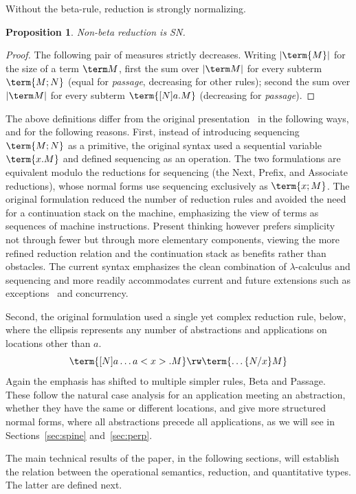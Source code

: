 \documentclass[10pt,a4paper]{amsart}
\newtheorem{proposition}[theorem]{Proposition}
\begin{document}
Without the beta-rule, reduction is strongly normalizing.

\begin{proposition}
\label{prop:non-beta SN}
Non-beta reduction is SN.
\end{proposition}

\begin{proof}
The following pair of measures strictly decreases. Writing $|\term{M}|$ for the size of a term $\term M$, first the sum over $|\term M|$ for every subterm $\term{M;N}$ (equal for \emph{passage}, decreasing for other rules); second the sum over $|\term M|$ for every subterm $\term{[N]a.M}$ (decreasing for \emph{passage}).
\end{proof}

The above definitions differ from the original presentation~\cite{Heijltjes-2022} in the following ways, and for the following reasons. First, instead of introducing sequencing $\term{M;N}$ as a primitive, the original syntax used a sequential variable $\term{x.M}$ and defined sequencing as an operation. The two formulations are equivalent modulo the reductions for sequencing (the Next, Prefix, and Associate reductions), whose normal forms use sequencing exclusively as $\term{x;M}$. The original formulation reduced the number of reduction rules and avoided the need for a continuation stack on the machine, emphasizing the view of terms as sequences of machine instructions. Present thinking however prefers simplicity not through fewer but through more elementary components, viewing the more refined reduction relation and the continuation stack as benefits rather than obstacles. The current syntax emphasizes the clean combination of $\lambda$-calculus and sequencing and more readily accommodates current and future extensions such as exceptions~\cite{Heijltjes-2025} and concurrency.

Second, the original formulation used a single yet complex reduction rule, below, where the ellipsis represents any number of abstractions and applications on locations other than $a$. 
\[
	\term{[N]a\dots a<x>.M}\rw\term{\dots\{N/x\}M}
\]
Again the emphasis has shifted to multiple simpler rules, Beta and Passage. These follow the natural case analysis for an application meeting an abstraction, whether they have the same or different locations, and give more structured normal forms, where all abstractions precede all applications, as we will see in Sections~\ref{sec:spine} and~\ref{sec:perp}.

The main technical results of the paper, in the following sections, will establish the relation between the operational semantics, reduction, and quantitative types. The latter are defined next.
\end{document}
